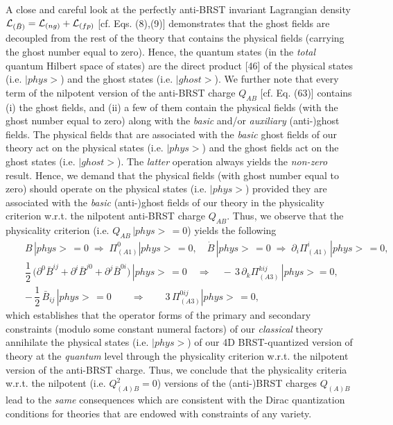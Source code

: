 \documentclass[12pt]{article}
\begin{document}
A close and careful look at the perfectly anti-BRST invariant Lagrangian density ${\cal L}_{(\bar B)} = {\cal L}_{(ng)} + {\cal L}_{(fp)}$ 
[cf. Eqs. (8),(9)] demonstrates that the ghost fields are decoupled from the rest of the theory that contains the
 physical fields (carrying the ghost number equal to zero). Hence, the quantum states (in the 
{\it total} quantum Hilbert space of states) are the direct
 product [46] of the physical states (i.e. $|phys>$) and the ghost states (i.e. $|ghost>$). We further note that every term of the 
 nilpotent version of the anti-BRST charge $Q_{AB}$ [cf. Eq. (63)] contains (i) the ghost fields, and  (ii) a few of them contain the 
 physical fields (with the ghost number equal to zero) along with the {\it basic} and/or {\it auxiliary} (anti-)ghost fields.  The physical fields that are
 associated with the {\it basic} ghost fields of our theory act on the physical states (i.e. $|phys>$) and the ghost fields act on the
 ghost states (i.e. $|ghost>$). The {\it latter} operation always yields the {\it non-zero} result. Hence, we demand that the physical fields
 (with ghost number equal to zero) should operate on the physical states (i.e. $|phys>$) provided they are associated with the 
 {\it basic} (anti-)ghost fields of our theory in the physicality criterion w.r.t. the nilpotent anti-BRST charge $Q_{AB}$. Thus, we
 observe that the physicality criterion (i.e. $Q_{AB}\, |phys>\, = 0 $) yields the following
\begin{eqnarray}\label{67}
&&B \, |phys> \,= 0 \;\Longrightarrow \; \Pi^{0}_{(A1)} |phys>\, = 0, \quad 
\dot B \, |phys> \, = 0 \; \Longrightarrow \; \partial_i \Pi^i_{(A1)} \, |phys>\, = 0,
\nonumber\\
&&\dfrac{1}{2}\, \big (\partial^0 \bar B^{ij} + \partial^i \bar B^{j0}  + \partial^j \bar B^{0i}  \big ) \, |phys> \, = 0 
\quad \Longrightarrow \quad -\, 3\,\partial_k \Pi^{kij}_{(A3)} \, |phys> = 0, \nonumber\\
&& -\, \dfrac{1}{2}\, \bar B_{ij} \, |phys> \,= 0 \qquad \Longrightarrow \qquad  3\,\Pi^{0ij}_{(A3)} |phys>\, = 0, 
\end{eqnarray}
which establishes that the operator forms of the primary and secondary constraints (modulo some constant numeral factors)
of our {\it classical } theory annihilate the physical states 
(i.e. $|phys>$) of our 4D BRST-quantized version of theory at the {\it quantum} level through the physicality criterion w.r.t. the nilpotent
version of the anti-BRST charge. Thus, we conclude that the physicality criteria w.r.t. the nilpotent (i.e. $Q_{(A)B}^2 = 0$)
versions of the (anti-)BRST charges
$Q_{(A)B}$ lead to the {\it same} consequences which are consistent with the Dirac quantization conditions for theories that are
endowed with constraints of any variety.
\end{document}

